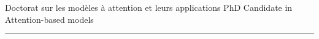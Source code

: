 \begin{minipage}{0.35\textwidth}
\end{minipage}
\begin{minipage}{0.65\textwidth}
   \vspace{2mm}
  \sc \montserratthin

  \ifFrench
    Doctorat sur les modèles à attention et leurs applications
  \else
    PhD Candidate in Attention-based models
  \fi
\end{minipage}
\vspace{4mm}
\hrule